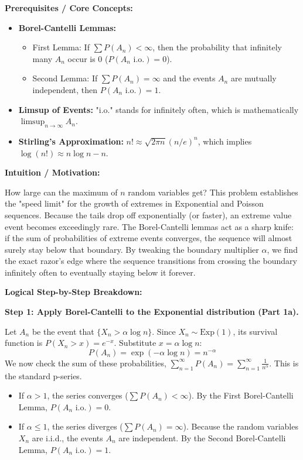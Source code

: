 \begin{solution}
\textbf{Prerequisites / Core Concepts:}
\begin{itemize}
    \item \textbf{Borel-Cantelli Lemmas:} 
        \begin{itemize}
            \item First Lemma: If $\sum P(A_n) < \infty$, then the probability that infinitely many $A_n$ occur is 0 ($P(A_n \text{ i.o.}) = 0$).
            \item Second Lemma: If $\sum P(A_n) = \infty$ and the events $A_n$ are mutually independent, then $P(A_n \text{ i.o.}) = 1$.
        \end{itemize}
    \item \textbf{Limsup of Events:} "i.o." stands for infinitely often, which is mathematically $\limsup_{n \to \infty} A_n$.
    \item \textbf{Stirling's Approximation:} $n! \approx \sqrt{2\pi n} (n/e)^n$, which implies $\log(n!) \approx n \log n - n$.
\end{itemize}

\textbf{Intuition / Motivation:}

How large can the maximum of $n$ random variables get? This problem establishes the "speed limit" for the growth of extremes in Exponential and Poisson sequences. Because the tails drop off exponentially (or faster), an extreme value event becomes exceedingly rare. The Borel-Cantelli lemmas act as a sharp knife: if the sum of probabilities of extreme events converges, the sequence will almost surely stay below that boundary. By tweaking the boundary multiplier $\alpha$, we find the exact razor's edge where the sequence transitions from crossing the boundary infinitely often to eventually staying below it forever.

\textbf{Logical Step-by-Step Breakdown:}

\textbf{Step 1: Apply Borel-Cantelli to the Exponential distribution (Part 1a).}

Let $A_n$ be the event that $\{X_n > \alpha \log n\}$.
Since $X_n \sim \text{Exp}(1)$, its survival function is $P(X_n > x) = e^{-x}$.
Substitute $x = \alpha \log n$:
\[ P(A_n) = \exp(-\alpha \log n) = n^{-\alpha} \]
We now check the sum of these probabilities, $\sum_{n=1}^\infty P(A_n) = \sum_{n=1}^\infty \frac{1}{n^\alpha}$.
This is the standard p-series.
\begin{itemize}
    \item If $\alpha > 1$, the series converges ($\sum P(A_n) < \infty$). By the First Borel-Cantelli Lemma, $P(A_n \text{ i.o.}) = 0$.
    \item If $\alpha \leq 1$, the series diverges ($\sum P(A_n) = \infty$). Because the random variables $X_n$ are i.i.d., the events $A_n$ are independent. By the Second Borel-Cantelli Lemma, $P(A_n \text{ i.o.}) = 1$.
\end{itemize}


\end{solution}
